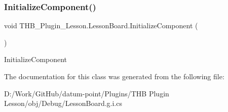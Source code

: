\subsubsection{\texorpdfstring{Initialize\+Component()}{InitializeComponent()}\hspace{0.1cm}{\footnotesize\ttfamily [2/2]}}
{\footnotesize\ttfamily void T\+H\+B\+\_\+\+Plugin\+\_\+\+Lesson.\+Lesson\+Board.\+Initialize\+Component (\begin{DoxyParamCaption}{ }\end{DoxyParamCaption})}



Initialize\+Component 



The documentation for this class was generated from the following file\+:\begin{DoxyCompactItemize}
\item 
D\+:/\+Work/\+Git\+Hub/datum-\/point/\+Plugins/\+T\+H\+B Plugin Lesson/obj/\+Debug/Lesson\+Board.\+g.\+i.\+cs\end{DoxyCompactItemize}
